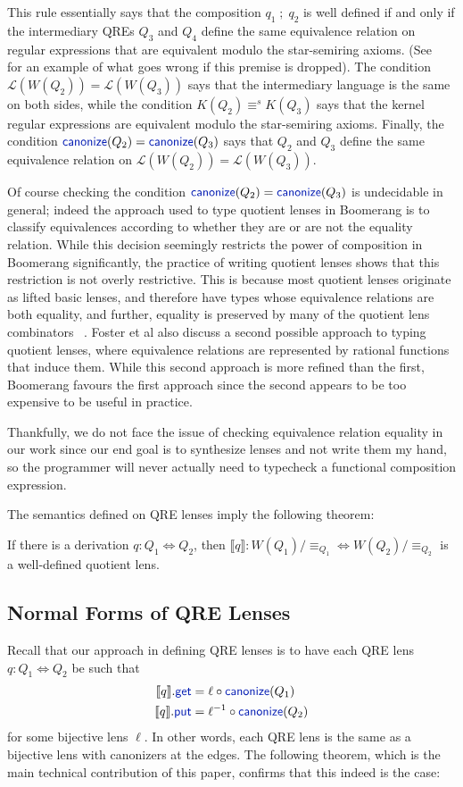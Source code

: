 \documentclass[acmsmall,screen]{acmart}
\newcommand{\kw}[1]{\textcolor{dkblue}{\ensuremath{\mathsf{#1}}}}
\newcommand{\eqrel}[1]{\ensuremath{\equiv_{#1}}}
\newcommand{\canonize}{\ensuremath{\kw{canonize}}}
\newcommand{\get}{\ensuremath{\kw{get}}}
\newcommand{\lput}{\ensuremath{\kw{put}}}
\begin{document}
This rule essentially says that the composition $q_1 \; ; \; q_2$ is well
defined if and only if the intermediary QREs $Q_3$ and $Q_4$ define the same
equivalence relation on regular expressions that are equivalent modulo the
star-semiring axioms. (See~\cite[\S 4]{quotientlenses} for an example of what
goes wrong if this premise is dropped). The condition $\mathcal{L}(W(Q_2)) =
\mathcal{L}(W(Q_3))$ says that the intermediary language is the same on both
sides, while the condition $K(Q_2) \equiv^s K(Q_3)$ says that the kernel
regular expressions are equivalent modulo the star-semiring axioms. Finally,
the condition $\canonize(Q_2) = \canonize(Q_3)$ says that $Q_2$ and $Q_3$
define the same equivalence relation on $\mathcal{L}(W(Q_2))=
\mathcal{L}(W(Q_3))$.

Of course checking the condition $\canonize(Q_2) = \canonize(Q_3)$ is
undecidable in general; indeed the approach used to type quotient lenses in
Boomerang is to classify equivalences according to whether they are or are not
the equality relation. While this decision seemingly restricts the
power of composition in Boomerang significantly, the practice of writing
quotient lenses shows that this restriction is not overly restrictive. This is 
because most quotient lenses originate as lifted basic lenses, and
therefore have types whose equivalence relations are both equality, and further,
equality is preserved by many of the quotient lens combinators
~\cite{quotientlenses}. Foster et al also discuss a second possible approach to
typing quotient lenses, where equivalence relations are represented by rational
functions that induce them. While this second approach is more refined than the
first, Boomerang favours the first approach since the second appears to be too
expensive to be useful in practice. 

Thankfully, we do not face the issue of checking equivalence relation equality
in our work since our end goal is to synthesize lenses and not write them my
hand, so the programmer will never actually need to typecheck a functional
composition expression.

The semantics defined on QRE lenses imply the following theorem:
\begin{theorem}
If there is a derivation $q : Q_1 \Leftrightarrow Q_2$, then $\llbracket q
\rrbracket : W(Q_1)/{\eqrel{Q_1}} \Leftrightarrow W(Q_2)/{\eqrel{Q_2}}$ is a
well-defined quotient lens.
\end{theorem}
\subsection{Normal Forms of QRE Lenses}
Recall that our approach in defining QRE lenses is to have each QRE lens $q: Q_1
\Leftrightarrow Q_2$ be such that
\begin{align*}
\llbracket q \rrbracket.\get &= \ell \circ \canonize(Q_1)\\
\llbracket q \rrbracket.\lput &= \ell^{-1} \circ \canonize(Q_2)
\end{align*}
for some bijective lens $\ell$. In other words, each QRE lens is the same as a
bijective lens with canonizers at the edges. The following theorem,
which is the main technical contribution of this paper, confirms that this
indeed is the case:
\end{document}
